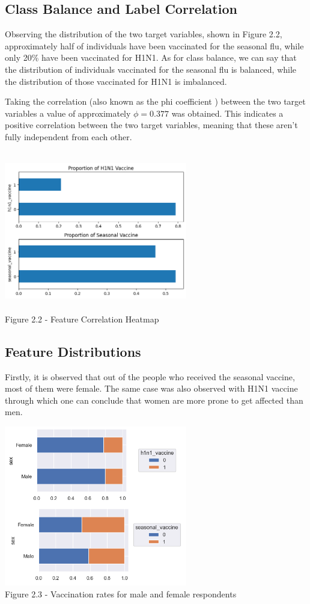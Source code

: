 \documentclass{IEEEtran}
\begin{document}
\subsection{Class Balance and Label Correlation}
Observing the distribution of the two target variables, shown in Figure 2.2, approximately half of individuals have been vaccinated for the seasonal flu, while only 20\% have been vaccinated for H1N1. As for class balance, we can say that the distribution of individuals vaccinated for the seasonal flu is balanced, while the distribution of those vaccinated for H1N1 is imbalanced.

Taking the correlation (also known as the phi coefficient ) between the two target variables a value of approximately $\phi = 0.377$ was obtained. This indicates a positive correlation between the two target variables, meaning that these aren't fully independent from each other. 
\begin{center}
    \includegraphics[width = 8cm,height=7cm]{figures/Proportion.png}\\  
    Figure 2.2 - Feature Correlation Heatmap
\end{center}



\subsection{Feature Distributions}
Firstly, it is observed that out of the people who received the seasonal vaccine, most of them were female. The same case was also observed with H1N1 vaccine through which one can conclude that women are more prone to get affected than men.
\begin{center}
    \includegraphics[width = 8cm,height=7cm]{figures/Sex.png}\\
    Figure 2.3 - Vaccination rates for male and female respondents
\end{center}
\end{document}
